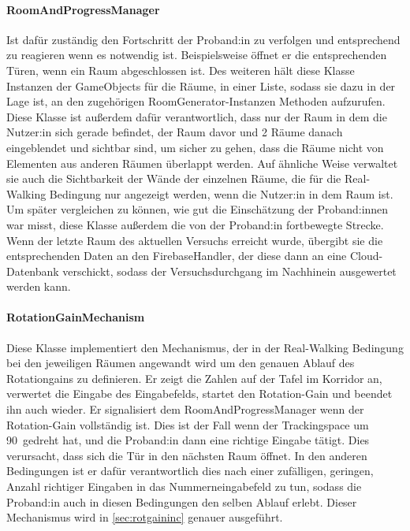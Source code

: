 \begin{multicols*}{2}
    \paragraph{RoomAndProgressManager}
    Ist dafür zuständig den Fortschritt der Proband:in zu verfolgen und entsprechend zu reagieren wenn es notwendig ist. Beispielsweise öffnet er die entsprechenden Türen, wenn ein Raum abgeschlossen ist.
    Des weiteren hält diese Klasse Instanzen der GameObjects für die Räume, in einer Liste, sodass sie dazu in der Lage ist, an den zugehörigen RoomGenerator-Instanzen Methoden aufzurufen. Diese Klasse ist außerdem dafür verantwortlich, dass nur der Raum in dem die Nutzer:in sich gerade befindet, der Raum davor und 2 Räume danach eingeblendet und sichtbar sind, um sicher zu gehen, dass die Räume nicht von Elementen aus anderen Räumen überlappt werden. Auf ähnliche Weise verwaltet sie auch die Sichtbarkeit der Wände der einzelnen Räume, die für die Real-Walking Bedingung nur angezeigt werden, wenn die Nutzer:in in dem Raum ist.
    Um später vergleichen zu können, wie gut die Einschätzung der Proband:innen war misst, diese Klasse außerdem die von der Proband:in fortbewegte Strecke. Wenn der letzte Raum des aktuellen Versuchs erreicht wurde, übergibt sie die entsprechenden Daten an den FirebaseHandler, der diese dann an eine Cloud-Datenbank verschickt, sodass der Versuchsdurchgang im Nachhinein ausgewertet werden kann.

    \paragraph{RotationGainMechanism}

    Diese Klasse implementiert den Mechanismus, der in der Real-Walking Bedingung bei den jeweiligen Räumen angewandt wird um den genauen Ablauf des Rotationgains zu definieren. Er zeigt die Zahlen auf der Tafel im Korridor an, verwertet die Eingabe des Eingabefelds, startet den Rotation-Gain und beendet ihn auch wieder. Er signalisiert dem RoomAndProgressManager wenn der Rotation-Gain vollständig ist. Dies ist der Fall wenn der Trackingspace um
    90\textdegree\
    gedreht hat, und die Proband:in dann eine richtige Eingabe tätigt. Dies verursacht, dass sich die Tür in den nächsten Raum öffnet. In den anderen Bedingungen ist er dafür verantwortlich dies nach einer zufälligen, geringen, Anzahl richtiger Eingaben in das Nummerneingabefeld zu tun, sodass die Proband:in auch in diesen Bedingungen den selben Ablauf erlebt. Dieser Mechanismus wird in \autoref{sec:rotgaininc} genauer ausgeführt.


\end{multicols*}
